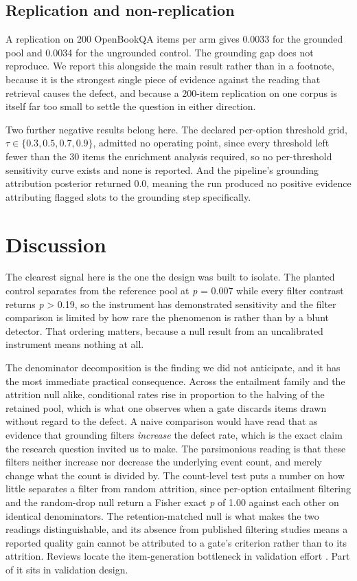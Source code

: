 \documentclass[11pt]{article}
\begin{document}
\subsection{Replication and non-replication}

A replication on 200 OpenBookQA items per arm gives 0.0033 for the grounded pool and 0.0034 for the ungrounded control. The grounding gap does not reproduce. We report this alongside the main result rather than in a footnote, because it is the strongest single piece of evidence against the reading that retrieval causes the defect, and because a 200-item replication on one corpus is itself far too small to settle the question in either direction.

Two further negative results belong here. The declared per-option threshold grid, $\tau \in \{0.3, 0.5, 0.7, 0.9\}$, admitted no operating point, since every threshold left fewer than the 30 items the enrichment analysis required, so no per-threshold sensitivity curve exists and none is reported. And the pipeline's grounding attribution posterior returned 0.0, meaning the run produced no positive evidence attributing flagged slots to the grounding step specifically.

\section{Discussion}

The clearest signal here is the one the design was built to isolate. The planted control separates from the reference pool at \emph{p} = 0.007 while every filter contrast returns \emph{p} > 0.19, so the instrument has demonstrated sensitivity and the filter comparison is limited by how rare the phenomenon is rather than by a blunt detector. That ordering matters, because a null result from an uncalibrated instrument means nothing at all.

The denominator decomposition is the finding we did not anticipate, and it has the most immediate practical consequence. Across the entailment family and the attrition null alike, conditional rates rise in proportion to the halving of the retained pool, which is what one observes when a gate discards items drawn without regard to the defect. A naive comparison would have read that as evidence that grounding filters \emph{increase} the defect rate, which is the exact claim the research question invited us to make. The parsimonious reading is that these filters neither increase nor decrease the underlying event count, and merely change what the count is divided by. The count-level test puts a number on how little separates a filter from random attrition, since per-option entailment filtering and the random-drop null return a Fisher exact \emph{p} of 1.00 against each other on identical denominators. The retention-matched null is what makes the two readings distinguishable, and its absence from published filtering studies means a reported quality gain cannot be attributed to a gate's criterion rather than to its attrition. Reviews locate the item-generation bottleneck in validation effort \citep{tan2025review,falcao2022feasibility}. Part of it sits in validation design.
\end{document}
